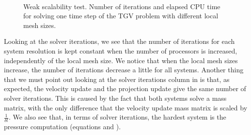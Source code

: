 \begin{figure}[p]
  \\
  \caption{Weak scalability test. Number of iterations and elapsed CPU time for solving one time step of the TGV problem with different local mesh sizes.}
  \label{fig-TGV_SRK_scal}
\end{figure}

Looking at the solver iterations, we see that the number of iterations for each system resolution is kept constant when the number of processors is increased, independently of the local mesh size. We notice that when the local mesh sizes increase, the number of iterations decrease a little for all systems. Another thing that we must point out looking at the solver iterations column in  is that, as expected, the velocity update and the projection update give the same number of solver iterations. This is caused by the fact that both systems solve a mass matrix, with the only difference that the velocity update mass matrix is scaled by $ \frac{1}{\delta t} $. We also see that, in terms of solver iterations, the hardest system is the pressure computation (equations  and ). %

